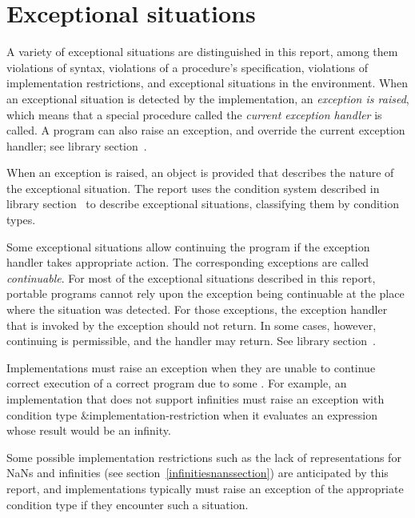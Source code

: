 \section{Exceptional situations}
\label{exceptionalsituationsection}

A variety of exceptional situations
are distinguished in this report, among them violations of syntax,
violations of a procedure's specification, violations of
implementation restrictions, and exceptional situations in the
environment.  When an exceptional situation is detected by the
implementation, an \textit{exception is raised},
which means that a special procedure called the \textit{current
  exception handler} is called.  A program can also raise an
exception, and override the current exception handler; see
library section~.

When an exception is raised, an object is provided that
describes the nature of the exceptional situation.  The report uses
the condition system described in library section~ to
describe exceptional situations, classifying them by condition types.

Some exceptional situations allow continuing the program if the
exception handler takes appropriate action.  The corresponding
exceptions are called \textit{continuable}.
For most of the exceptional situations described in this report,
portable programs cannot rely upon the exception being continuable
at the place where the situation was detected.
For those exceptions, the exception handler that is invoked by the
exception should not return.
In some cases, however, continuing is permissible, and the
handler may return.  See library section~.

Implementations must raise an exception
when they are unable to continue correct execution
of a correct program due to some .  For
example, an implementation that does not support infinities
must raise an exception with condition type
{\cf\&implementation-restriction} when it evaluates an expression
whose result would be an infinity.

Some possible implementation restrictions such as the lack of
representations for NaNs and infinities (see
section~\ref{infinitiesnanssection}) are anticipated by this report,
and implementations typically must raise an exception of the
appropriate condition type if they encounter such a situation.

